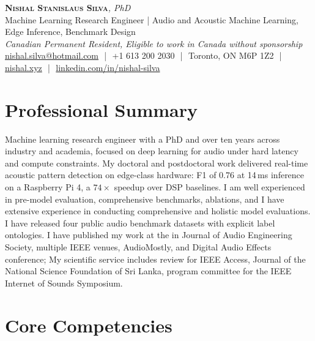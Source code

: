 \documentclass[11pt]{article}
\begin{document}
\pagestyle{empty}

\begin{center}
    {\LARGE \scshape \textbf{Nishal Stanislaus Silva}}{\large \textit {, PhD}}
    \\[1pt]
    {\small Machine Learning Research Engineer | Audio and Acoustic Machine Learning, Edge Inference, Benchmark Design}
    \\[1pt]
    {\footnotesize\textit{Canadian Permanent Resident, Eligible to work in Canada without sponsorship}}
    \\[1pt]
    {\small
    \href{mailto:nishal.silva@hotmail.com}{nishal.silva@hotmail.com}
    \,\,|\,\, +1 613 200 2030
    \,\,|\,\, Toronto, ON M6P 1Z2
    \,\,|\,\, \href{https://nishal.xyz}{nishal.xyz}
    \,\,|\,\, \href{https://www.linkedin.com/in/nishal-silva}{linkedin.com/in/nishal-silva}}
\end{center}

\section*{Professional Summary}

Machine learning research engineer with a PhD and over ten years across industry and academia, focused on deep learning for audio under hard latency and compute constraints. My doctoral and postdoctoral work delivered real-time acoustic pattern detection on edge-class hardware: F1 of 0.76 at 14\,ms inference on a Raspberry Pi 4, a $74\times$ speedup over DSP baselines. I am well experienced in pre-model evaluation, comprehensive benchmarks, ablations, and I have extensive experience in conducting comprehensive and holistic model evaluations. I have released four public audio benchmark datasets with explicit label ontologies. I have published my work at the in Journal of Audio Engineering Society, multiple IEEE venues, AudioMostly, and Digital Audio Effects conference; My scientific service includes review for IEEE Access, Journal of the National Science Foundation of Sri Lanka, program committee for the IEEE Internet of Sounds Symposium.

\section*{Core Competencies}
\end{document}
